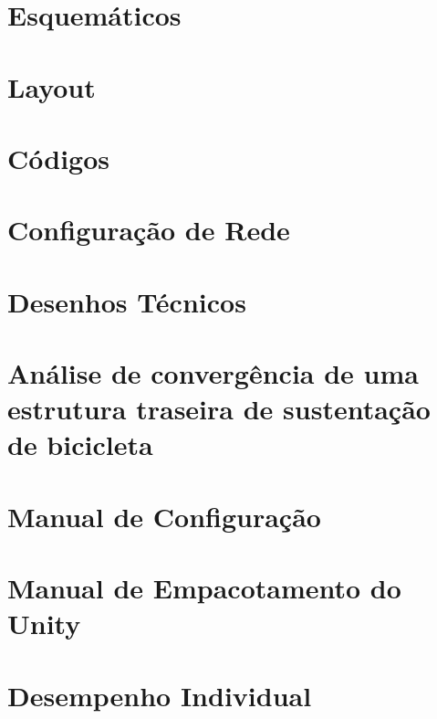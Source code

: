 \begin{apendicesenv}
\chapter{Esquemáticos}


\chapter{Layout}


\chapter{Códigos}

\chapter{Configuração de Rede}



\chapter{Desenhos Técnicos}


\chapter{Análise de convergência de uma estrutura traseira de sustentação de bicicleta}


\chapter{Manual de Configuração}


\chapter{Manual de Empacotamento do Unity}


\chapter{Desempenho Individual}


  
\end{apendicesenv}
